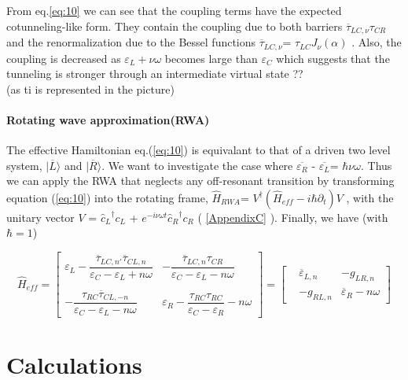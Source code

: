 From eq.\ref{eq:10} we can see that the coupling terms have the expected cotunneling-like form. They contain the coupling due to both barriers $\overline{\tau}_{LC,\nu} {\tau}_{CR} $ and the renormalization due to the Bessel functions $\overline{\tau}_{LC,\nu}$= $\tau_{LC} J_{\nu}(\alpha)$ . Also, the coupling is decreased as $\varepsilon_L + \nu   \omega$ becomes large than  $\varepsilon_C $ which suggests that the tunneling is stronger through an intermediate virtual state ??
\\ (as ti is represented in the picture)

\paragraph{Rotating wave approximation(RWA)}

The effective Hamiltonian eq.(\ref{eq:10}) is equivalant to that of a driven two level system, $\vert \overline{L} \rangle$ and $\vert \overline{R} \rangle$. We want to investigate the case where $\overline{\varepsilon_R}$ - $\overline{\varepsilon_L}$= $\hbar \nu \omega$. Thus we can apply the RWA that neglects any off-resonant transition by transforming equation (\ref{eq:10}) into the rotating frame, $\widehat{H}_{RWA}$= $ V^{\dagger} (\widehat{H}_{eff}-i\hbar\partial_t) V$ , with the unitary vector $V$ = ${\widehat{c}_{L}}^{\dagger} c_{L}$ + $e^{-i\nu\omega t} {\widehat{c}_{R}}^{\dagger} c_{R}$ ( \ref{AppendixC} ). Finally, we have (with $\hbar=1$)

\begin{equation} \label{eq:11}
\widehat{H}_{eff}= \begin{bmatrix}
\varepsilon_L - \dfrac  {\overline{\tau}_{LC,n'} \overline{\tau}_{CL,n}}  {\varepsilon_C - \varepsilon_L + n \omega}  
& - \dfrac{  \overline{\tau}_{LC,n} {\tau}_{CR} } {\varepsilon_C -  \varepsilon_L-n\omega} 
 \\ 
\\
-\dfrac{ {\tau}_{RC} \overline{\tau}_{CL,-n}  } {\varepsilon_C -\varepsilon_L - n \omega } 
& \varepsilon_R - \dfrac{\tau_{RC}\tau_{RC} }{ \varepsilon_C - \varepsilon_R} - n \omega
\end{bmatrix} 
=\begin{bmatrix}
 & \overline{\varepsilon}_{L,n} & -g_{LR,n} 
\\
& -g_{RL,n}  & \overline{\varepsilon}_{R}- n\omega
\end{bmatrix}
\end{equation}

\section{Calculations}

